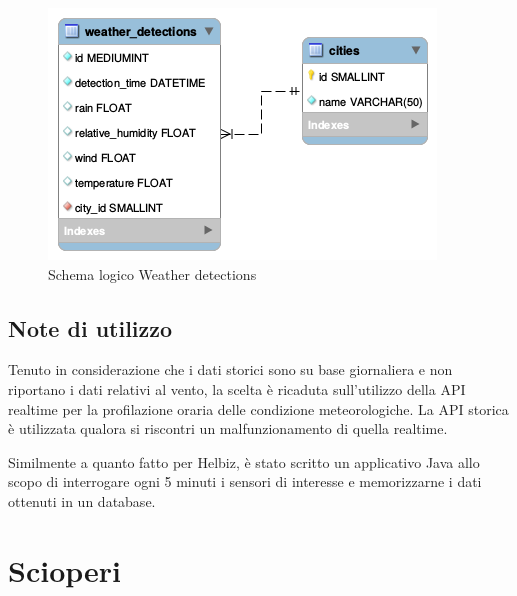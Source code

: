 \begin{figure}[H]                                                                                                                                                            
\centering                                                                                                                                                                   
\includegraphics{diagrams/weather_detection_logic}                                                                                                                                   
\caption{Schema logico Weather detections}                                                                                                                                            
\label{fig:weather_detection_logic}                                                                                                                                                           
\end{figure}


\subsection{Note di utilizzo}

Tenuto in considerazione che i dati storici sono su base giornaliera e non riportano
i dati relativi al vento, la scelta è ricaduta sull'utilizzo della API realtime per la
profilazione oraria delle condizione meteorologiche. La API storica è utilizzata qualora
si riscontri un malfunzionamento di quella realtime.

Similmente a quanto fatto per Helbiz, è stato scritto un applicativo Java allo scopo di
interrogare ogni 5 minuti i sensori di interesse e memorizzarne i dati ottenuti in un
database.


\section{Scioperi}

